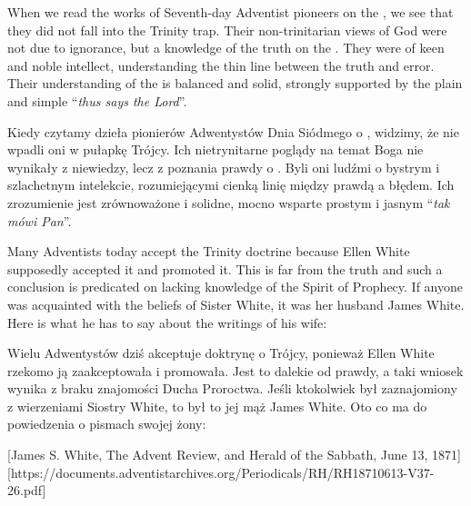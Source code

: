 When we read the works of Seventh-day Adventist pioneers on the , we see that they did not fall into the Trinity trap. Their non-trinitarian views of God were not due to ignorance, but a knowledge of the truth on the . They were of keen and noble intellect, understanding the thin line between the truth and error. Their understanding of the  is balanced and solid, strongly supported by the plain and simple “\textit{thus says the Lord}”.


Kiedy czytamy dzieła pionierów Adwentystów Dnia Siódmego o , widzimy, że nie wpadli oni w pułapkę Trójcy. Ich nietrynitarne poglądy na temat Boga nie wynikały z niewiedzy, lecz z poznania prawdy o . Byli oni ludźmi o bystrym i szlachetnym intelekcie, rozumiejącymi cienką linię między prawdą a błędem. Ich zrozumienie  jest zrównoważone i solidne, mocno wsparte prostym i jasnym “\textit{tak mówi Pan}”.


Many Adventists today accept the Trinity doctrine because Ellen White supposedly accepted it and promoted it. This is far from the truth and such a conclusion is predicated on lacking knowledge of the Spirit of Prophecy. If anyone was acquainted with the beliefs of Sister White, it was her husband James White. Here is what he has to say about the writings of his wife:


Wielu Adwentystów dziś akceptuje doktrynę o Trójcy, ponieważ Ellen White rzekomo ją zaakceptowała i promowała. Jest to dalekie od prawdy, a taki wniosek wynika z braku znajomości Ducha Proroctwa. Jeśli ktokolwiek był zaznajomiony z wierzeniami Siostry White, to był to jej mąż James White. Oto co ma do powiedzenia o pismach swojej żony:


[James S. White, The Advent Review, and Herald of the Sabbath, June 13, 1871][https://documents.adventistarchives.org/Periodicals/RH/RH18710613-V37-26.pdf]


